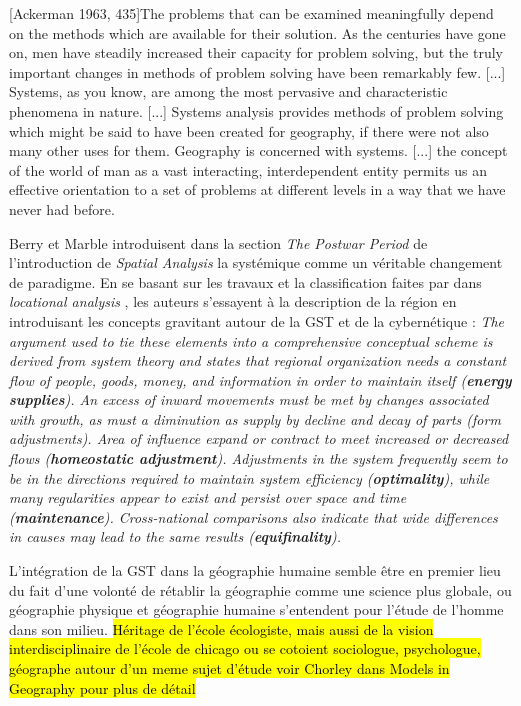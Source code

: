 [Ackerman 1963, 435]{The problems that can be examined meaningfully depend on the methods which are available for their solution. As the centuries have gone on, men have steadily increased their capacity for problem solving, but the truly important changes in methods of problem solving have been remarkably few. [...] Systems, as you know, are among the most pervasive and characteristic phenomena in nature. [...] Systems analysis provides methods of problem solving which might be said to have been created for geography, if there were not also many other uses for them. Geography is concerned with systems. [...] the concept of the world of man as a vast interacting, interdependent entity permits us an effective orientation to a set of problems at different levels in a way that we have never had before.}

Berry et Marble introduisent dans la section \textit{The Postwar Period} de l'introduction de \textit{Spatial Analysis} la systémique comme un véritable changement de paradigme. En se basant sur les travaux et la classification faites par \textcite{Haggett1965} dans \textit{locational analysis} , les auteurs s'essayent à la description de la région en introduisant les concepts gravitant autour de la GST et de la cybernétique : \textit{The argument used to tie these elements into a comprehensive conceptual scheme is derived from system theory and states that regional organization needs a constant flow of people, goods, money, and information in order to maintain itself (\textbf{energy supplies}). An excess of inward movements must be met by changes associated with growth, as must a diminution as supply by decline and decay of parts (form adjustments). Area of influence expand or contract to meet increased or decreased flows (\textbf{homeostatic adjustment}). Adjustments in the system frequently seem to be in the directions required to maintain system efficiency (\textbf{optimality}), while many regularities appear to exist and persist over space and time (\textbf{maintenance}). Cross-national comparisons also indicate that wide differences in causes may lead to the same results (\textbf{equifinality}).}

L'intégration de la GST dans la géographie humaine semble être en premier lieu du fait d'une volonté de rétablir la géographie comme une science plus globale, ou géographie physique et géographie humaine s'entendent pour l'étude de l'homme dans son milieu. \hl{Héritage de l'école écologiste, mais aussi de la vision interdisciplinaire de l'école de chicago ou se cotoient sociologue, psychologue, géographe autour d'un meme sujet d'étude voir Chorley dans Models in Geography pour plus de détail}

